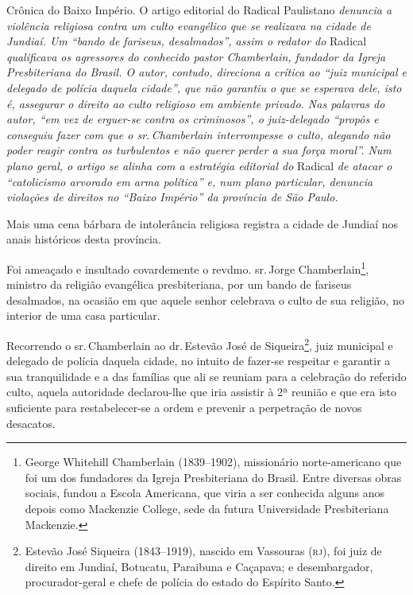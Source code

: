 \begin{didascalia}
Crônica do Baixo Império. O artigo editorial do Radical Paulistano
\emph{denuncia a violência religiosa contra um culto evangélico que se
realizava na cidade de Jundiaí. Um ``bando de fariseus, desalmados'',
assim o redator do} Radical \emph{qualificava os agressores do conhecido
pastor Chamberlain, fundador da Igreja Presbiteriana do Brasil. O autor,
contudo, direciona a crítica ao ``juiz municipal e delegado de polícia
daquela cidade'', que não garantiu o que se esperava dele, isto é,
assegurar o direito ao culto religioso em ambiente privado. Nas palavras
do autor, ``em vez de erguer-se contra os criminosos'', o juiz-delegado
``propôs e conseguiu fazer com que o sr.\,Chamberlain interrompesse o
culto, alegando não poder reagir contra os turbulentos e não querer
perder a sua força moral''. Num plano geral, o artigo se alinha com a
estratégia editorial do} Radical \emph{de atacar o ``catolicismo arvorado
em arma política'' e, num plano particular, denuncia violações de
direitos no ``Baixo Império'' da província de São Paulo.}
\end{didascalia}



Mais uma cena bárbara de intolerância religiosa registra a cidade de
Jundiaí nos anais históricos desta província.

Foi ameaçado e insultado covardemente o revdmo. sr.\,Jorge
Chamberlain\footnote{George Whitehill Chamberlain (1839--1902),
  missionário norte-americano que foi um dos fundadores da Igreja
  Presbiteriana do Brasil. Entre diversas obras sociais, fundou a Escola
  Americana, que viria a ser conhecida alguns anos depois como Mackenzie
  College, sede da futura Universidade Presbiteriana Mackenzie.},
ministro da religião evangélica presbiteriana, por um bando de fariseus
desalmados, na ocasião em que aquele senhor celebrava o culto de sua
religião, no interior de uma casa particular.

Recorrendo o sr.\,Chamberlain ao dr.\,Estevão José de Siqueira\footnote{
  Estevão José Siqueira (1843--1919), nascido em Vassouras (\textsc{rj}), foi juiz
  de direito em Jundiaí, Botucatu, Paraibuna e Caçapava; e
  desembargador, procurador-geral e chefe de polícia do estado do
  Espírito Santo.}, juiz municipal e delegado de polícia daquela cidade,
no intuito de fazer-se respeitar e garantir a sua tranquilidade e a das
famílias que ali se reuniam para a celebração do referido culto, aquela
autoridade declarou-lhe que iria assistir à 2ª reunião e que era isto
suficiente para restabelecer-se a ordem e prevenir a perpetração de
novos desacatos.

